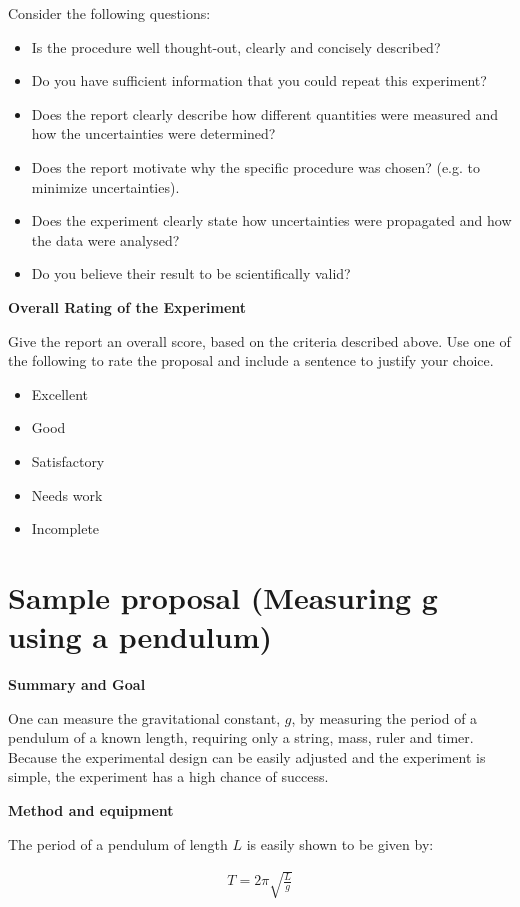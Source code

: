 Consider the following questions:
\begin{itemize}
\item Is the procedure well thought-out, clearly and concisely described? 
\item Do you have sufficient information that you could repeat this experiment?
\item Does the report clearly describe how different quantities were measured and how the uncertainties were determined?
\item Does the report motivate why the specific procedure was chosen? (e.g. to minimize uncertainties).
\item Does the experiment clearly state how uncertainties were propagated and how the data were analysed?
\item Do you believe their result to be scientifically valid?
\end{itemize}


\textbf{Overall Rating of the Experiment}

Give the report an overall score, based on the criteria described above. Use one of the following to rate the proposal and include a sentence to justify your choice.
\begin{itemize}
\item Excellent
\item Good
\item Satisfactory
\item Needs work
\item Incomplete
\end{itemize}

\newpage
\section{Sample proposal (Measuring g using a pendulum)}
 \vspace{0.25cm}
\textbf{Summary and Goal}

One can measure the gravitational constant, $g$, by measuring the period of a pendulum of a known length, requiring only a string, mass, ruler and timer. Because the experimental design can be easily adjusted and the experiment is simple, the experiment has a high chance of success.

\textbf{Method and equipment}

The period of a pendulum of length $L$ is easily shown to be given by:

\begin{align*}
T=2\pi \sqrt {\frac{L}{g}}
\end{align*}

